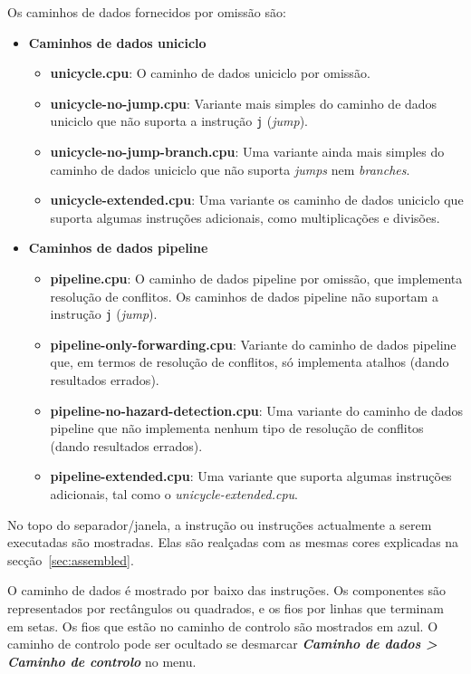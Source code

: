 \documentclass[11pt,a4paper,twoside,titlepage]{article}
\newcommand{\menupath}[1]{\textbf{\emph{#1}}}
\begin{document}
Os caminhos de dados fornecidos por omissão são:
\begin{itemize}
	\item \textbf{Caminhos de dados uniciclo}
	\begin{itemize}
		\item \textbf{unicycle.cpu}: O caminho de dados uniciclo por omissão.
		\item \textbf{unicycle-no-jump.cpu}: Variante mais simples do caminho
			de dados uniciclo que não suporta a instrução \verb+j+
			(\emph{jump}).
		\item \textbf{unicycle-no-jump-branch.cpu}: Uma variante ainda mais
			simples do caminho de dados uniciclo que não suporta \emph{jumps}
			nem \emph{branches}.
		\item \textbf{unicycle-extended.cpu}: Uma variante os caminho de dados
			uniciclo que suporta algumas instruções adicionais, como
			multiplicações e divisões.
	\end{itemize}
	
	\item \textbf{Caminhos de dados pipeline}
	\begin{itemize}
		\item \textbf{pipeline.cpu}: O caminho de dados pipeline por omissão,
			que implementa resolução de conflitos. Os caminhos de dados 
			pipeline não suportam a instrução \verb+j+ (\emph{jump}).
		\item \textbf{pipeline-only-forwarding.cpu}: Variante do caminho de 
			dados pipeline que, em termos de resolução de conflitos, só
			implementa atalhos (dando resultados errados).
		\item \textbf{pipeline-no-hazard-detection.cpu}: Uma variante do
			caminho de dados pipeline que não implementa nenhum tipo de
			resolução de conflitos (dando resultados errados).
		\item \textbf{pipeline-extended.cpu}: Uma variante que suporta algumas
			instruções adicionais, tal como o \emph{unicycle-extended.cpu}.
	\end{itemize}
\end{itemize}

No topo do separador/janela, a instrução ou instruções actualmente a serem
executadas são mostradas. Elas são realçadas com as mesmas cores explicadas
na secção~\ref{sec:assembled}.

O caminho de dados é mostrado por baixo das instruções.
Os componentes são representados por rectângulos ou quadrados, e os fios por
linhas que terminam em setas.
Os fios que estão no caminho de controlo são mostrados em azul.
O caminho de controlo pode ser ocultado se desmarcar
\menupath{Caminho de dados > Caminho de controlo} no menu.
\end{document}
